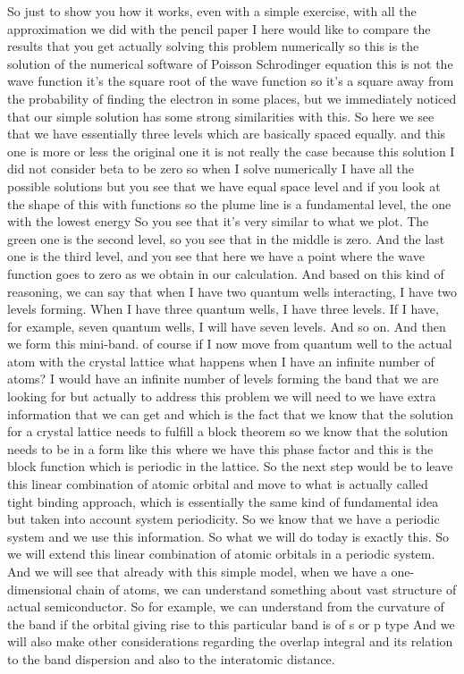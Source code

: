 So just to show you how it works, even with a simple exercise, with all the approximation we did with the pencil paper I here would like to compare the results that you get actually solving this problem numerically so this is the solution of the numerical software of Poisson Schrodinger equation this is not the wave function it's the square root of the wave function so it's a square away from the probability of finding the electron in some places, but we immediately noticed that our simple solution has some strong similarities with this. So here we see that we have essentially three levels which are basically spaced equally. and this one is more or less the original one it is not really the case because this solution I did not consider beta to be zero so when I solve numerically I have all the possible solutions but you see that we have equal space level and if you look at the shape of this with functions so the plume line is a fundamental level, the one with the lowest energy So you see that it's very similar to what we plot. The green one is the second level, so you see that in the middle is zero. And the last one is the third level, and you see that here we have a point where the wave function goes to zero as we obtain in our calculation. And based on this kind of reasoning, we can say that when I have two quantum wells interacting, I have two levels forming. When I have three quantum wells, I have three levels. If I have, for example, seven quantum wells, I will have seven levels. And so on. And then we form this mini-band. of course if I now move from quantum well to the actual atom with the crystal lattice what happens when I have an infinite number of atoms? I would have an infinite number of levels forming the band that we are looking for but actually to address this problem we will need to we have extra information that we can get and which is the fact that we know that the solution for a crystal lattice needs to fulfill a block theorem so we know that the solution needs to be in a form like this where we have this phase factor and this is the block function which is periodic in the lattice. So the next step would be to leave this linear combination of atomic orbital and move to what is actually called tight binding approach, which is essentially the same kind of fundamental idea but taken into account system periodicity. So we know that we have a periodic system and we use this information. So what we will do today is exactly this. So we will extend this linear combination of atomic orbitals in a periodic system. And we will see that already with this simple model, when we have a one-dimensional chain of atoms, we can understand something about vast structure of actual semiconductor. So for example, we can understand from the curvature of the band if the orbital giving rise to this particular band is of s or p type And we will also make other considerations regarding the overlap integral and its relation to the band dispersion and also to the interatomic distance.
